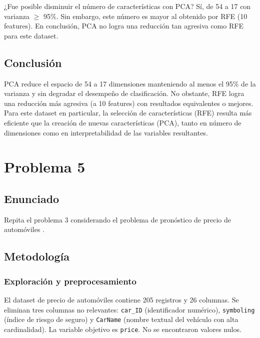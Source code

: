 \documentclass{article}
\begin{document}
¿Fue posible disminuir el número de características con PCA? Sí, de 54 a 17 con varianza $\geq$ 95\%. Sin embargo, este número es mayor al obtenido por RFE (10 features). En conclusión, PCA no logra una reducción tan agresiva como RFE para este dataset.

\subsection{Conclusión}

PCA reduce el espacio de 54 a 17 dimensiones manteniendo al menos el 95\% de la varianza y sin degradar el desempeño de clasificación. No obstante, RFE logra una reducción más agresiva (a 10 features) con resultados equivalentes o mejores. Para este dataset en particular, la selección de características (RFE) resulta más eficiente que la creación de nuevas características (PCA), tanto en número de dimensiones como en interpretabilidad de las variables resultantes.


\section{Problema 5}

\subsection{Enunciado}

Repita el problema 3 considerando el problema de pronóstico de precio de automóviles \cite{kaggleCarPricePrediction}.

\subsection{Metodología}

\subsubsection{Exploración y preprocesamiento}

El dataset de precio de automóviles contiene 205 registros y 26 columnas. Se eliminan tres columnas no relevantes: \texttt{car\_ID} (identificador numérico), \texttt{symboling} (índice de riesgo de seguro) y \texttt{CarName} (nombre textual del vehículo con alta cardinalidad). La variable objetivo es \texttt{price}. No se encontraron valores nulos.
\end{document}
